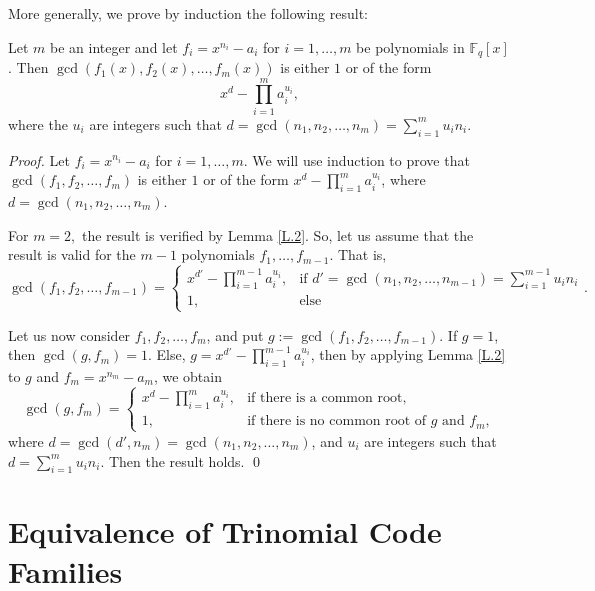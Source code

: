 \documentclass[12pt]{elsarticle}
\def\dsum #1#2{\displaystyle{\sum_{#1}^{#2}}}
\def\dprod #1#2{\displaystyle{\prod_{#1}^{#2}}}
\theoremstyle{break}
{\theorembodyfont{\upshape}
    \newtheorem{theorem}{Theorem}[section] %
    \newtheorem{lemma}[theorem]{Lemma} %
    \newtheorem{proposition}[theorem]{Proposition}
    \newtheorem{corollary}[theorem]{Corollary}
    \newtheorem{definition}[theorem]{Definition}
    \newtheorem{example}[theorem]{Example}
    \newtheorem{remark}[theorem]{Remark}
    \newtheorem{conjecture}[theorem]{Conjecture}
    \newtheorem*{proof}{{Proof}}
	\newtheorem*{notation}{Notation}
	\newtheorem*{main}{Cain Theorem}
	\newtheorem*{problem}{Problem}
}
\begin{document}
More generally, we prove by induction the following result:
\begin{lemma}\label{Iso_Genaral}
 Let $m$ be an integer and let $f_i = x^{n_i} - a_i$ for $i = 1, \ldots, m$ be polynomials in $\mathbb{F}_q[x]$.
 Then $ \gcd(f_1(x), f_2(x), \ldots, f_m(x))$ is either $1$ or of the form $$x^{d} - \dprod{i=1}{m} a_i^{u_i},$$ where the $u_i$ are integers such that $d = \gcd(n_1, n_2, \ldots, n_m) = \dsum{i=1}{m} u_i n_i$.
\end{lemma}
\begin{proof}
Let $f_i = x^{n_i} - a_i$ for $i=1, \ldots, m$. We will use induction to prove that $\gcd(f_1, f_2, \ldots, f_m)$ is either $1$ or of the form $x^d - \dprod{i=1}{m} a_i^{u_i}$, where $d = \gcd(n_1, n_2, \ldots, n_m)$. 

\noindent For $m=2,$ the result is verified by Lemma \ref{L.2}. So, let us assume that the result is valid for the $m-1$ polynomials $f_1, \ldots, f_{m-1}$. That is, 
$$
\gcd(f_1, f_2, \ldots, f_{m-1}) = 
\begin{cases} 
x^{d'} - \dprod{i=1}{m-1} a_i^{u_i}, & \text{if } d' = \gcd(n_1, n_2, \ldots, n_{m-1}) = \dsum{i=1}{m-1} u_i n_i  \\
1, & \text{else}
\end{cases}.
$$ 

\noindent Let us now consider $f_1, f_2, \ldots, f_m$, and put  $g := \gcd(f_1, f_2, \ldots, f_{m-1})$. 
If $g = 1$, then $\gcd(g, f_m) = 1$.  Else, $g = x^{d'} - \dprod{i=1}{m-1} a_i^{u_i}$, then by applying   Lemma \ref{L.2} to $g$ and $f_m = x^{n_m} - a_m$, we obtain
$$
\gcd(g, f_m) = 
\begin{cases} 
x^d - \dprod{i=1}{m} a_i^{u_i}, & \text{if there is a common root,}\\
1, & \text{if there is no common root of } g \text{ and } f_m,
\end{cases}
$$
where $d = \gcd(d', n_m) = \gcd(n_1, n_2, \ldots, n_m)$, and $u_i$ are integers such that $d = \dsum{i=1}{m} u_i n_i$. Then the result holds.
\qed
\end{proof}








 



\section{Equivalence of Trinomial Code Families}\label{sec:eq_trinomial}
\end{document}
